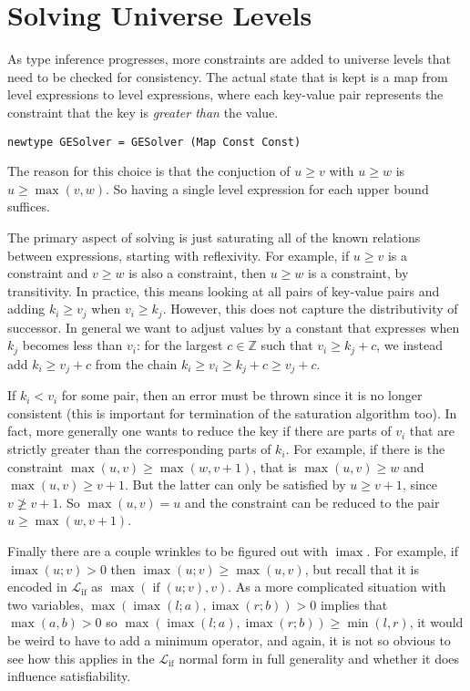 \documentclass[11pt, twoside, reqno]{book}
\DeclareMathOperator{\imax}{imax}
\DeclareMathOperator{\ifop}{if}
\begin{document}
\section{Solving Universe Levels}
\label{solv-uni-lvl}

As type inference progresses, more constraints are added to universe levels that need to be checked for consistency.
The actual state that is kept is a map from level expressions to level expressions, where each key-value pair represents the constraint that the key is \emph{greater than} the value.

\begin{verbatim}
newtype GESolver = GESolver (Map Const Const)
\end{verbatim}

The reason for this choice is that the conjuction of $u \ge v$ with $u \ge w$ is $u \ge \max(v, w)$. So having a single level expression for each upper bound suffices.

The primary aspect of solving is just saturating all of the known relations between expressions, starting with reflexivity.
For example, if $u \ge v$ is a constraint and $v \ge w$ is also a constraint, then $u \ge w$ is a constraint, by transitivity.
In practice, this means looking at all pairs of key-value pairs and adding $k_i \ge v_j$ when $v_i \ge k_j$.
However, this does not capture the distributivity of successor.
In general we want to adjust values by a constant that expresses when $k_j$ becomes less than $v_i$: for the largest $c \in \mathbb{Z}$ such that $v_i \ge k_j + c$, we instead add $k_i \ge v_j + c$ from the chain $k_i \ge v_i \ge k_j + c \ge v_j + c$.

If $k_i < v_i$ for some pair, then an error must be thrown since it is no longer consistent (this is important for termination of the saturation algorithm too).
In fact, more generally one wants to reduce the key if there are parts of $v_i$ that are strictly greater than the corresponding parts of $k_i$.
For example, if there is the constraint $\max(u, v) \ge \max(w, v+1)$, that is $\max(u, v) \ge w$ and $\max(u, v) \ge v+1$.
But the latter can only be satisfied by $u \ge v+1$, since $v \ngeq v+1$.
So $\max(u, v) = u$ and the constraint can be reduced to the pair $u \ge \max(w, v+1)$.

Finally there are a couple wrinkles to be figured out with $\imax$.
For example, if $\imax(u; v) > 0$ then $\imax(u; v) \ge \max(u, v)$, but recall that it is encoded in $\mathcal{L}_{\ifop}$ as $\max(\ifop(u; v), v)$.
As a more complicated situation with two variables, $\max(\imax(l; a), \imax(r; b)) > 0$ implies that $\max(a, b) > 0$ so $\max(\imax(l; a), \imax(r; b)) \ge \min(l, r)$, it would be weird to have to add a minimum operator, and again, it is not so obvious to see how this applies in the $\mathcal{L}_{\ifop}$ normal form in full generality and whether it does influence satisfiability.
\end{document}
